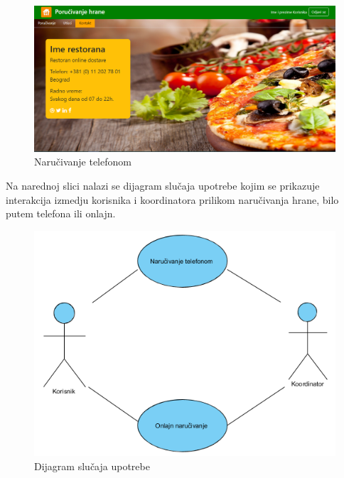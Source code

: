 \begin{figure}[!h]
    \leavevmode
    \begin{center}
    \includegraphics[height=0.3\textheight]{slike/kontakt.png}
    \end{center}
    \caption{Naručivanje telefonom} %
    \label{fig:slika_kontakt}
\end{figure}

\newpage
    
Na narednoj slici nalazi se dijagram slučaja upotrebe kojim se prikazuje interakcija izmedju korisnika i koordinatora prilikom naručivanja hrane, bilo putem telefona ili onlajn.

\begin{figure}[ht]
    \leavevmode
    \begin{center}
    \includegraphics[height=0.4\textheight]{slike/Upravljanje_porudzbinomUC.png}
    \end{center}
    \caption{Dijagram slučaja upotrebe}
\end{figure}



